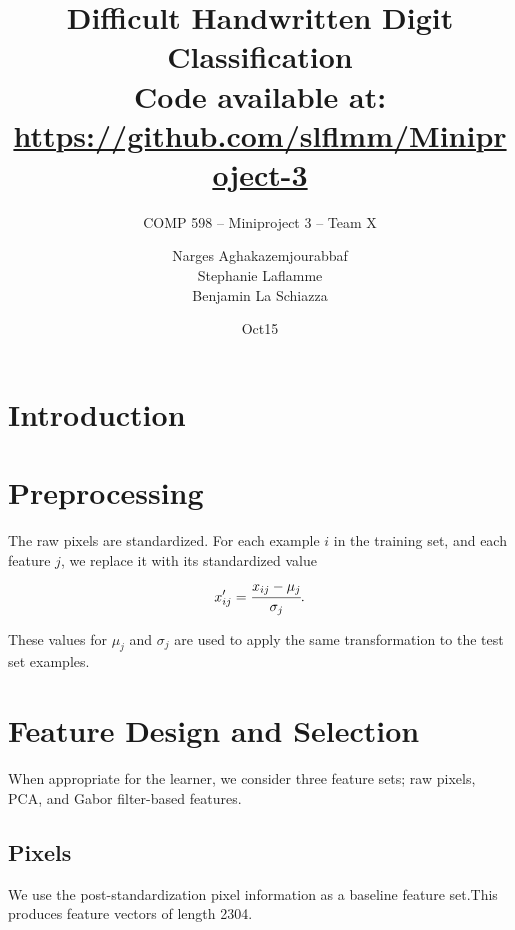 \documentclass{acm_proc_article-sp}
\begin{document}
\title{Difficult Handwritten Digit Classification \\
{\normalsize Code available at: \url{https://github.com/slflmm/Miniproject-3}}} 
\subtitle{COMP 598 -- Miniproject 3 -- Team X}

\author{
\alignauthor 
Narges Aghakazemjourabbaf\\
\alignauthor
Stephanie Laflamme\\
\alignauthor Benjamin La Schiazza\\
}

\date{Oct15}



\maketitle
\begin{abstract}

\end{abstract}

\section{Introduction}%

\section{Preprocessing}
The raw pixels are standardized. For each example $i$ in the training set, and each feature $j$, we replace it with its standardized value $$x'_{ij} = \cfrac{x_{ij} - \mu_{j}}{\sigma_{j}}.$$

These values for $\mu_j$ and $\sigma_j$ are used to apply the same transformation to the test set examples.

\section{Feature Design and Selection}
When appropriate for the learner, we consider three feature sets; raw pixels, PCA, and Gabor filter-based features.

\subsection{Pixels}
We use the post-standardization pixel information as a baseline feature set.This produces feature vectors of length 2304. 
\end{document}
